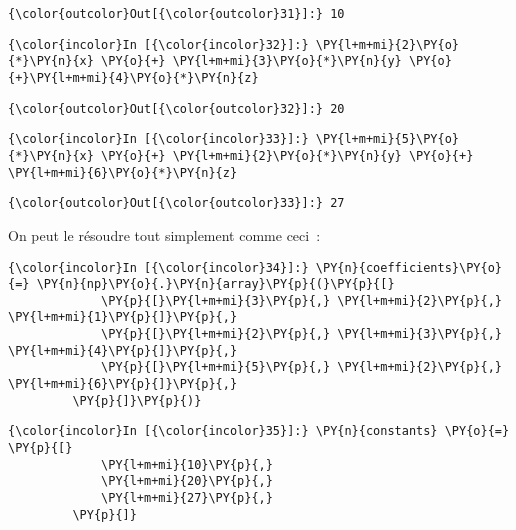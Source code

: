 \begin{Verbatim}[commandchars=\\\{\}]
{\color{outcolor}Out[{\color{outcolor}31}]:} 10
\end{Verbatim}
            
    \begin{Verbatim}[commandchars=\\\{\}]
{\color{incolor}In [{\color{incolor}32}]:} \PY{l+m+mi}{2}\PY{o}{*}\PY{n}{x} \PY{o}{+} \PY{l+m+mi}{3}\PY{o}{*}\PY{n}{y} \PY{o}{+}\PY{l+m+mi}{4}\PY{o}{*}\PY{n}{z}
\end{Verbatim}


\begin{Verbatim}[commandchars=\\\{\}]
{\color{outcolor}Out[{\color{outcolor}32}]:} 20
\end{Verbatim}
            
    \begin{Verbatim}[commandchars=\\\{\}]
{\color{incolor}In [{\color{incolor}33}]:} \PY{l+m+mi}{5}\PY{o}{*}\PY{n}{x} \PY{o}{+} \PY{l+m+mi}{2}\PY{o}{*}\PY{n}{y} \PY{o}{+} \PY{l+m+mi}{6}\PY{o}{*}\PY{n}{z}
\end{Verbatim}


\begin{Verbatim}[commandchars=\\\{\}]
{\color{outcolor}Out[{\color{outcolor}33}]:} 27
\end{Verbatim}
            
    On peut le résoudre tout simplement comme ceci~:

    \begin{Verbatim}[commandchars=\\\{\}]
{\color{incolor}In [{\color{incolor}34}]:} \PY{n}{coefficients}\PY{o}{=} \PY{n}{np}\PY{o}{.}\PY{n}{array}\PY{p}{(}\PY{p}{[}
             \PY{p}{[}\PY{l+m+mi}{3}\PY{p}{,} \PY{l+m+mi}{2}\PY{p}{,} \PY{l+m+mi}{1}\PY{p}{]}\PY{p}{,}
             \PY{p}{[}\PY{l+m+mi}{2}\PY{p}{,} \PY{l+m+mi}{3}\PY{p}{,} \PY{l+m+mi}{4}\PY{p}{]}\PY{p}{,}
             \PY{p}{[}\PY{l+m+mi}{5}\PY{p}{,} \PY{l+m+mi}{2}\PY{p}{,} \PY{l+m+mi}{6}\PY{p}{]}\PY{p}{,}
         \PY{p}{]}\PY{p}{)}
\end{Verbatim}


    \begin{Verbatim}[commandchars=\\\{\}]
{\color{incolor}In [{\color{incolor}35}]:} \PY{n}{constants} \PY{o}{=} \PY{p}{[}
             \PY{l+m+mi}{10}\PY{p}{,}
             \PY{l+m+mi}{20}\PY{p}{,}
             \PY{l+m+mi}{27}\PY{p}{,}
         \PY{p}{]}
\end{Verbatim}


